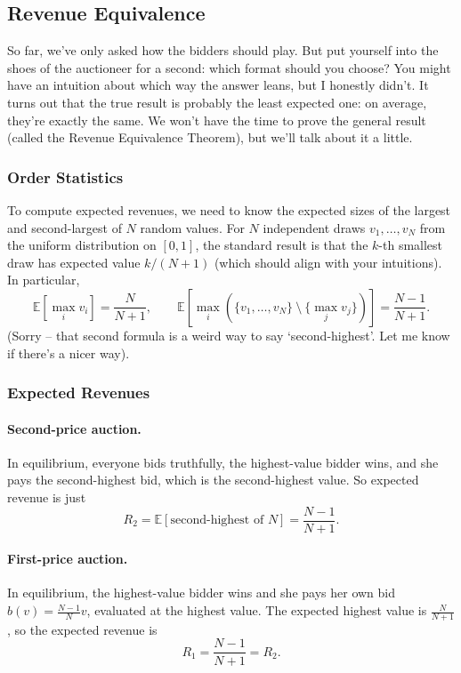 \documentclass[12pt]{article}
\newcommand{\bbE}{\mathbb{E}}
\theoremstyle{definition}
\theoremstyle{remark}
\theoremstyle{plain}                          %
\begin{document}
\subsection{Revenue Equivalence}\label{sec:revenue}

So far, we've only asked how the bidders should play. But put yourself into the shoes of the auctioneer for a second: which format should you choose? You might have an intuition about which way the answer leans, but I honestly didn't. It turns out that the true result is probably the least expected one: on average, they're exactly the same. We won't have the time to prove the general result (called the Revenue Equivalence Theorem), but we'll talk about it a little.

\subsubsection{Order Statistics}

To compute expected revenues, we need to know the expected sizes of the largest and second-largest of $N$ random values. For $N$ independent draws $v_1,\dots,v_N$ from the uniform distribution on $[0,1]$, the standard result is that the $k$-th smallest draw has expected value $k/(N+1)$ (which should align with your intuitions). In particular,
\[
  \bbE\left[\max_i v_i\right] = \frac{N}{N+1},
  \qquad
  \bbE\left[\max_i\left(\{v_1,\dots,v_N\}\ \setminus \ \{\max_j v_j\}\right)\right] = \frac{N-1}{N+1}.
\] (Sorry -- that second formula is a weird way to say `second-highest'. Let me know if there's a nicer way).

\subsubsection{Expected Revenues}

\paragraph{Second-price auction.} In equilibrium, everyone bids truthfully, the highest-value bidder wins, and she pays the second-highest bid, which is the second-highest value. So expected revenue is just
\[
  R_2= \bbE[\text{second-highest of } N] = \frac{N-1}{N+1}.
\]

\paragraph{First-price auction.} In equilibrium, the highest-value bidder wins and she pays her own bid $b(v) = \tfrac{N-1}{N} v$, evaluated at the highest value. The expected highest value is $\tfrac{N}{N+1}$, so the expected revenue is
\[
  R_1
  = \frac{N-1}{N+1} = R_2.
\]
\end{document}
